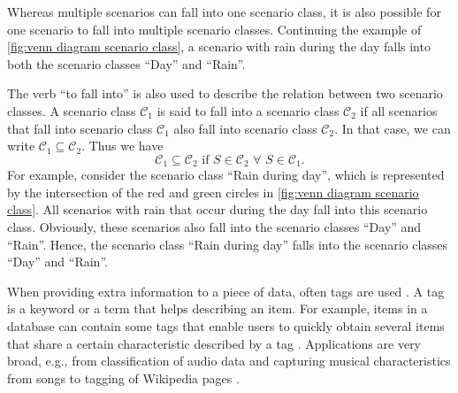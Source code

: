 Whereas multiple scenarios can fall into one scenario class, it is also possible for one scenario to fall into multiple scenario classes. Continuing the example of \cref{fig:venn diagram scenario class}, a scenario with rain during the day falls into both the scenario classes ``Day'' and ``Rain''.

The verb ``to fall into'' is also used to describe the relation between two scenario classes. A scenario class $\mathcal{C}_1$ is said to fall into a scenario class $\mathcal{C}_2$ if all scenarios that fall into scenario class $\mathcal{C}_1$ also fall into scenario class $\mathcal{C}_2$. In that case, we can write $\mathcal{C}_1 \subseteq \mathcal{C}_2$. Thus we have
\begin{equation}
	\mathcal{C}_1 \subseteq \mathcal{C}_2 \text{ if } S \in \mathcal{C}_2 \,\,\forall\,\, S \in \mathcal{C}_1.
\end{equation}
For example, consider the scenario class ``Rain during day'', which is represented by the intersection of the red and green circles in \cref{fig:venn diagram scenario class}. All scenarios with rain that occur during the day fall into this scenario class. Obviously, these scenarios also fall into the scenario classes ``Day'' and ``Rain''. Hence, the scenario class ``Rain during day'' falls into the scenario classes ``Day'' and ``Rain''.

When providing extra information to a piece of data, often tags are used \cite{smith2007tagging}. A tag is a keyword or a term that helps describing an item. For example, items in a database can contain some tags that enable users to quickly obtain several items that share a certain characteristic described by a tag \cite{craft2004tagging, vasquez2019controlling}. Applications are very broad, e.g., from classification of audio data \cite{kong2017joint} and capturing musical characteristics from songs \cite{ellis2011semantic} to tagging of Wikipedia pages \cite{voss2006collaborative}.

